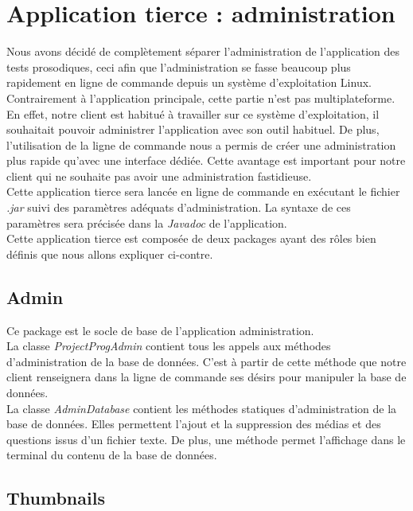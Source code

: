 \section{Application tierce : administration}

Nous avons décidé de complètement séparer l'administration de l'application des tests prosodiques, ceci afin que l'administration se fasse beaucoup plus rapidement en ligne de commande depuis un système d'exploitation Linux. Contrairement à l'application principale, cette partie n'est pas multiplateforme. En effet, notre client est habitué à travailler sur ce système d'exploitation, il souhaitait pouvoir administrer l'application avec son outil habituel. De plus, l'utilisation de la ligne de commande nous a permis de créer une administration plus rapide qu'avec une interface dédiée. Cette avantage est important pour notre client qui ne souhaite pas avoir une administration fastidieuse.\\

Cette application tierce sera lancée en ligne de commande en exécutant le fichier \textit{.jar} suivi des paramètres adéquats d'administration. La syntaxe de ces paramètres sera précisée dans la \textit{Javadoc} de l'application.\\

Cette application tierce est composée de deux packages ayant des rôles bien définis que nous allons expliquer ci-contre.

\subsection{Admin}

Ce package est le socle de base de l'application administration.\\
La classe \textit{ProjectProgAdmin} contient tous les appels aux méthodes d'administration de la base de données. C'est à partir de cette méthode que notre client renseignera dans la ligne de commande ses désirs pour manipuler la base de données.\\
La classe \textit{AdminDatabase} contient les méthodes statiques d'administration de la base de données. Elles permettent l'ajout et la suppression des médias et des questions issus d'un fichier texte. De plus, une méthode permet l'affichage dans le terminal du contenu de la base de données.

\subsection{Thumbnails}

